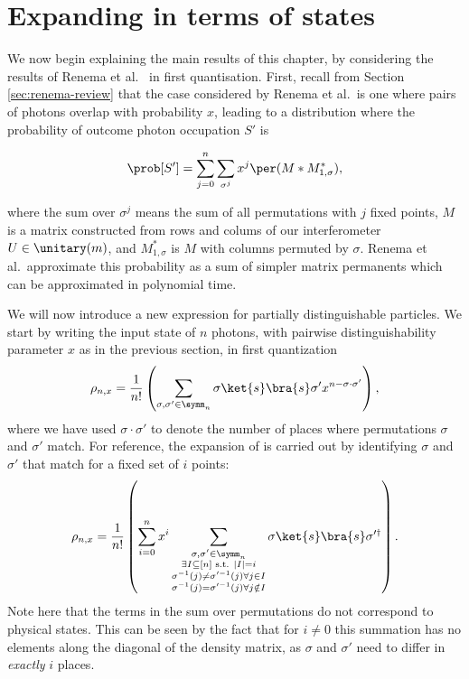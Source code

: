 \section{Expanding in terms of states}
\label{sec:expansion}

We now begin explaining the main results of this chapter, by considering the results of Renema et al.~\cite{renema2018, renema2018loss} in first quantisation. First, recall from Section \ref{sec:renema-review} that the case considered by Renema et al.\ is one where pairs of photons overlap with probability $x$, leading to a distribution where the probability of outcome photon occupation $S'$ is

\begin{equation}
\prob[S'] = \sum_{j=0}^n\sum_{\sigma^j}x^j\per(M*M^*_{1,\sigma}) , \label{eqn:renema-eqn}
\end{equation}

\noindent where the sum over $\sigma^j$ means the sum of all permutations with $j$ fixed points, $M$ is a matrix constructed from rows and colums of our interferometer $U\in \unitary(m)$, and $M^*_{1,\sigma}$ is $M$ with columns permuted by $\sigma$. Renema et al.\ approximate this probability as a sum of simpler matrix permanents which can be approximated in polynomial time.

We will now introduce a new expression for partially distinguishable particles. We start by writing the input state of $n$ photons, with pairwise distinguishability parameter $x$ as in the previous section, in first quantization
\begin{equation}
\label{eqn:rhon}
\rho_{n,x} = \frac{1}{n!}\left(\sum_{\sigma,\sigma'\in\symm_n}\sigma\ket{s}\bra{s}\sigma'x^{n-\sigma\cdot\sigma'}\right),
\end{equation}
where we have used $\sigma\cdot\sigma'$ to denote the number of places where permutations $\sigma$ and $\sigma'$ match.
For reference, the expansion of \cite{renema2018,renema2018loss} is carried out by identifying $\sigma$ and $\sigma'$ that match for a fixed set of $i$ points:
\begin{equation}
\label{eqn:rhoni}
\rho_{n,x} = \frac{1}{n!}\left(\sum_{i=0}^nx^i\sum_{\substack{\sigma,\sigma'\in\symm_n\\\exists I\subseteq [n] \textrm{ s.t. } |I|=i\\\sigma^{-1}(j)\neq\sigma'^{-1}(j)\forall j \in I\\\sigma^{-1}(j)=\sigma'^{-1}(j)\forall j \notin I}}\sigma\ket{s}\bra{s}\sigma'^\dagger\right).
\end{equation}
Note here that the terms in the sum over permutations do not correspond to physical states. 
This can be seen by the fact that for $i\neq 0$ this summation has no elements along the diagonal of the density matrix, as $\sigma$ and $\sigma'$ need to differ in \emph{exactly} $i$ places.

